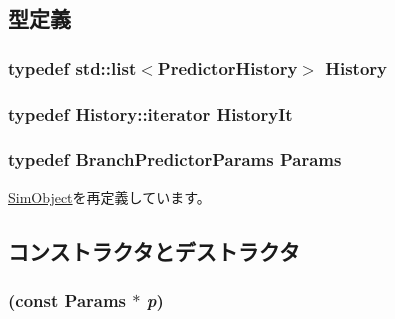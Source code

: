 \subsection{型定義}
\hypertarget{classBPredUnit_a4b4610c4c56c4d7061849e23009cbb4b}{
\subsubsection[{History}]{\setlength{\rightskip}{0pt plus 5cm}typedef {\bf std::list}$<${\bf PredictorHistory}$>$ {\bf History}}}
\label{classBPredUnit_a4b4610c4c56c4d7061849e23009cbb4b}
\hypertarget{classBPredUnit_abaefb3dcd19a61b2383910e6efb536eb}{
\subsubsection[{HistoryIt}]{\setlength{\rightskip}{0pt plus 5cm}typedef History::iterator {\bf HistoryIt}}}
\label{classBPredUnit_abaefb3dcd19a61b2383910e6efb536eb}
\hypertarget{classBPredUnit_aa715df0f49f029439cca4c7bd6e3d4fb}{
\subsubsection[{Params}]{\setlength{\rightskip}{0pt plus 5cm}typedef BranchPredictorParams {\bf Params}}}
\label{classBPredUnit_aa715df0f49f029439cca4c7bd6e3d4fb}


\hyperlink{classSimObject_a0f0761d2db586a23bb2a2880b8f387bb}{SimObject}を再定義しています。

\subsection{コンストラクタとデストラクタ}
\hypertarget{classBPredUnit_a1061023e2f959cf88ef9064923a4667f}{
\subsubsection[{BPredUnit}]{ (const {\bf Params} $\ast$ {\em p})}}
\label{classBPredUnit_a1061023e2f959cf88ef9064923a4667f}


